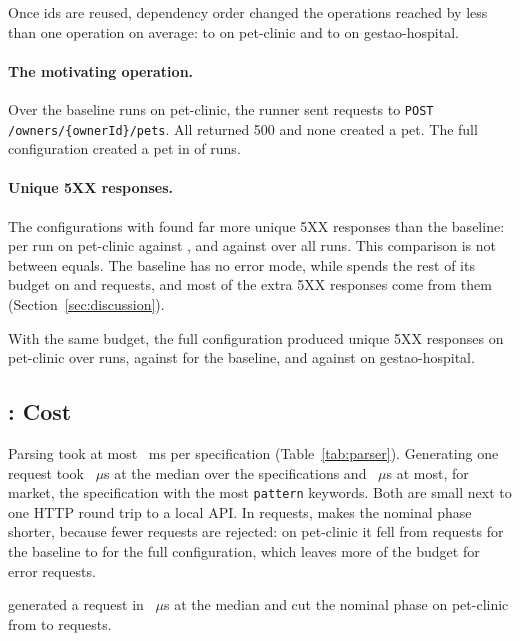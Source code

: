 \begin{observation}
\label{obs:order}
Once ids are reused, dependency order changed the operations reached by less
than one operation on average: \NPetclinicValuesPlusPoolOps to
\NPetclinicFullOps on pet-clinic and \NGestaohospitalValuesPlusPoolOps to
\NGestaohospitalFullOps on gestao-hospital.
\end{observation}

\paragraph{The motivating operation.} Over the \NReps baseline runs on
pet-clinic, the runner sent \NMotivBaselineRequests requests to
\texttt{POST /owners/\{ownerId\}/pets}. All \NMotivBaselineServer returned
500 and none created a pet. The full configuration created a pet in
\NMotivFullRunsOk of \NReps runs.

\paragraph{Unique 5XX responses.} The configurations with \tool found far
more unique 5XX responses than the baseline: \NPetclinicFullFaults per run
on pet-clinic against \NPetclinicBaselineFaults, and
\NPetclinicFullFaultsUnion against \NPetclinicBaselineFaultsUnion over all
runs. This comparison is not between equals. The baseline has no error
mode, while \tool spends the rest of its budget on  and
 requests, and most of the extra 5XX responses come from them
(Section~\ref{sec:discussion}).

\begin{observation}
\label{obs:faults}
With the same budget, the full configuration produced
\NPetclinicFullFaultsUnion unique 5XX responses on pet-clinic over \NReps
runs, against \NPetclinicBaselineFaultsUnion for the baseline, and
\NGestaohospitalFullFaultsUnion against \NGestaohospitalBaselineFaultsUnion
on gestao-hospital.
\end{observation}

\subsection{: Cost}
\label{sec:rq4}
Parsing took at most \NParseMsMax~ms per specification
(Table~\ref{tab:parser}). Generating one request took
\NGenUsMedian~$\mu$s at the median over the \NSpecs specifications and
\NGenUsMax~$\mu$s at most, for market, the specification with the most
\texttt{pattern} keywords. Both are small next to one
HTTP round trip to a local API. In requests, \tool makes the nominal phase
shorter, because fewer requests are rejected: on pet-clinic it fell from
\NPetclinicBaselineNominal requests for the baseline to
\NPetclinicFullNominal for the full configuration, which leaves more of the
budget for error requests.

\begin{observation}
\label{obs:cost}
\tool generated a request in \NGenUsMedian~$\mu$s at the median and cut the
nominal phase on pet-clinic from \NPetclinicBaselineNominal to
\NPetclinicFullNominal requests.
\end{observation}
